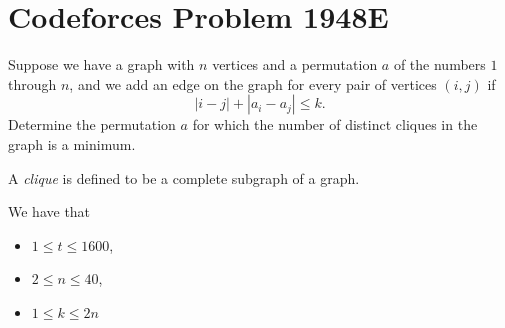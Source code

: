 \documentclass[a4paper, 12pt]{article}
\begin{document}
\section*{Codeforces Problem 1948E}

\begin{chirpbox}
    \begin{problem}
        Suppose we have a graph with \( n \) vertices and a permutation \( a \) of the numbers \( 1 \) through \( n \), and we add an edge on the graph for every pair of vertices \( (i, j) \) if
        \[
            | i - j | + | a_i - a_j | \le k
        .\]
        Determine the permutation \( a \) for which the number of distinct cliques in the graph is a minimum.
    \end{problem}
\end{chirpbox}

\begin{remark}
    A \textit{clique} is defined to be a complete subgraph of a graph.
\end{remark}

\begin{constraints}
    We have that
    \begin{itemize}
        \item \( 1 \le t \le 1600 \),
        \item \( 2 \le n \le 40 \),
        \item \( 1 \le k \le 2n \)
    \end{itemize}
\end{constraints}
\end{document}
